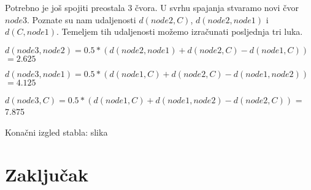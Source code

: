\documentclass[times, utf8, seminar, numeric]{fer}
\begin{document}
Potrebno je još spojiti preostala $3$ čvora. U svrhu spajanja stvaramo novi čvor $node3$. Poznate su nam udaljenosti $d(node2,C)$, $d(node2, node1)$ i  $d(C,node1)$. Temeljem tih udaljenosti možemo izračunati posljednja tri luka.

\indent $d(node3, node2) = 0.5 * (d(node2, node1) + d(node2, C) - d(node1, C)) $ \newline
\indent $= 2.625$ \newline

\indent $d(node3, node1) = 0.5 * (d(node1, C) + d(node2, C) - d(node1, node2)) $ \newline
\indent $=4.125 $ \newline

\indent $d(node3,C) = 0.5 * (d(node1, C) + d(node1, node2) - d(node2, C)) $ \newline
\indent = 7.875 \newline

Konačni izgled stabla:
	slika

\chapter{Zaključak}




\begin{comment}
\begin{sazetak}
Simbolička regresija je postupak otkrivanja matematičkog izraza u skupu podataka. Daje se pregled metoda za simboličku regresiju s naglaskom na genetsko programiranje. Obrađuju se problemi kao što su domene funkcija (nisu definirane na cijelom skupu realnih brojeva). Problemi se rješavaju intervalnom aritmetikom i linearnim skaliranjem. Na kraju se ukratko opisuje mogućnost paralelizacije i primjene. 

\kljucnerijeci{genetsko programiranje, s}

\end{sazetak}

\engtitle{Application of graphics coprocessors for program execution on stream programming model}

\begin{abstract}


\keywords{GPU, StreamIt, Sponge, StreamGate, CUDA, stream model, filter, optimization, graphics card}
\end{abstract}
\end{comment}
\end{document}
